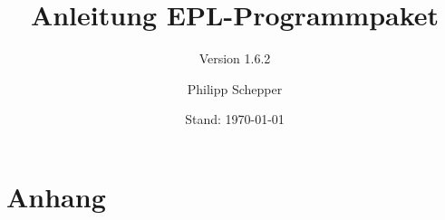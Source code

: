\documentclass[a4paper,ngerman,oneside]{scrbook}
\title{Anleitung EPL-Programmpaket}
\subtitle{Version 1.6.2}
\author{Philipp Schepper}
\date{Stand: \today}
\begin{document}
\maketitle

\frontmatter
\tableofcontents


\mainmatter






\appendix
\part{Anhang}



\end{document}
